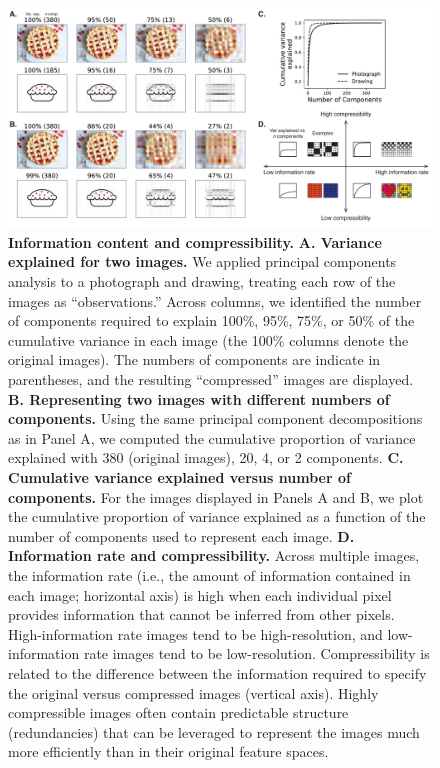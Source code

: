 \documentclass[english, 11pt]{article}
\begin{document}
\begin{figure}[tp]

  \centering
  \includegraphics[width=\textwidth]{figs/information_and_compressibility}
  
  \caption{\textbf{Information content and compressibility.} \textbf{A. Variance
  explained for two images.} We applied principal components analysis to a
  photograph and drawing, treating each row of the images as ``observations.''
  Across columns, we identified the number of components required to explain
  100\%, 95\%, 75\%, or 50\% of the cumulative variance in each image (the 100\%
  columns denote the original images). The numbers of components are indicate in
  parentheses, and the resulting ``compressed'' images are displayed. \textbf{B.
  Representing two images with different numbers of components.} Using the same
  principal component decompositions as in Panel A, we computed the cumulative
  proportion of variance explained with 380 (original images), 20, 4, or 2
  components. \textbf{C. Cumulative variance explained versus number of
  components.} For the images displayed in Panels A and B, we plot the cumulative
  proportion of variance explained as a function of the number of components used
  to represent each image. \textbf{D. Information rate and compressibility.}
  Across multiple images, the information rate (i.e., the amount of information
  contained in each image; horizontal axis) is high when each individual pixel
  provides information that cannot be inferred from other pixels.
  High-information rate images tend to be high-resolution, and low-information
  rate images tend to be low-resolution. Compressibility is related to the
  difference between the information required to specify the original versus
  compressed images (vertical axis). Highly compressible images often contain
  predictable structure (redundancies) that can be leveraged to represent the
  images much more efficiently than in their original feature spaces.}

\label{fig:information-compression} 
\end{figure}
\end{document}
